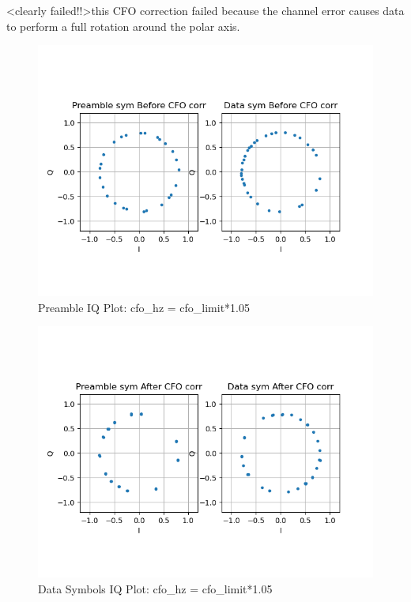 \documentclass[
	letterpaper, %
	10pt, %
]{CSUniSchoolLabReport}
\begin{document}
<clearly failed!!>this CFO correction failed because the channel error causes data to perform a full rotation around the polar axis.

\begin{figure}[H] %
	\centering %
	\includegraphics[width=1.2\textwidth]{assignment1h.png} %
	\caption{Preamble IQ Plot: cfo\_hz = cfo\_limit*1.05}
	\label{fig:block}
\end{figure}

\begin{figure}[H] %
	\centering %
	\includegraphics[width=1.2\textwidth]{assignment1i.png} %
	\caption{Data Symbols IQ Plot: cfo\_hz = cfo\_limit*1.05}
	\label{fig:block}
\end{figure}
\end{document}

